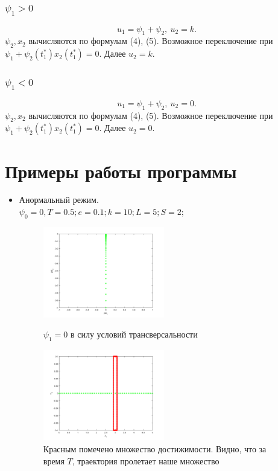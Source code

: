 \documentclass[12pt, fleqn]{article}
\begin{document}
\subsubsection{$\psi_1 > 0$}
\begin{equation}
u_1 = \psi_1 + \psi_2, \ u_2 = k.
\end{equation}
$\psi_2, x_2$ вычисляются по формулам (4), (5). Возможное переключение при $\psi_1 + \psi_2(t_1^*)x_2(t_1^*) = 0.$ Далее $u_2 = k$.

\subsubsection{$\psi_1 < 0$}
\begin{equation}
u_1 = \psi_1 + \psi_2, \ u_2 = 0.
\end{equation}
$\psi_2, x_2$ вычисляются по формулам (4), (5). Возможное переключение при $\psi_1 + \psi_2(t_1^*)x_2(t_1^*) = 0.$ Далее $u_2 = 0$.
\newpage
 \section{Примеры работы программы}
\begin{itemize}
\item
Анормальный режим.\\ 
$\psi_0 = 0, T = 0.5;
e = 0.1;
k = 10;
L = 5;
S = 2;
$\\
\begin{figure}[h]
\begin{center}
\includegraphics[width=0.5\textwidth]{psi_00.png}
\caption{$\psi_1 = 0$ в силу условий трансверсальности}
\includegraphics[width=0.5\textwidth]{psi_00x1x2.png}
\caption{Красным помечено множество достижимости. Видно, что за время $T$, траектория пролетает наше множество}
\end{center}
\end{figure}

\end{itemize}
\end{document}
